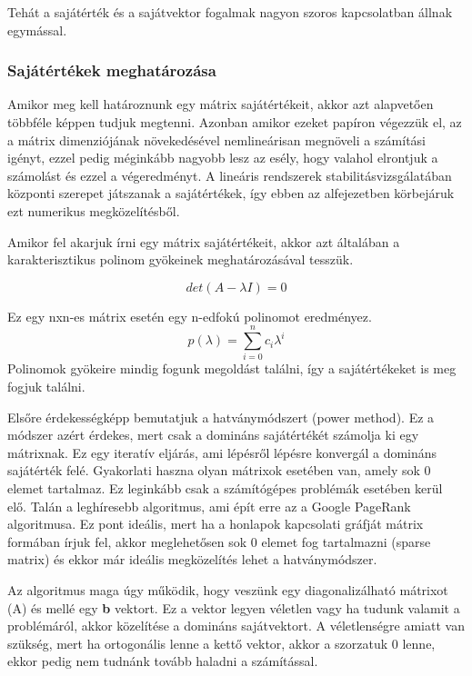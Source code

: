 \documentclass{article}
\theoremstyle{definition}
\theoremstyle{theorem}
\begin{document}
Tehát a sajátérték és a sajátvektor fogalmak nagyon szoros kapcsolatban állnak egymással.

\subsubsection{Sajátértékek meghatározása}
Amikor meg kell határoznunk egy mátrix sajátértékeit, akkor azt alapvetően többféle képpen tudjuk megtenni. Azonban amikor ezeket papíron végezzük el, az a mátrix dimenziójának növekedésével nemlineárisan megnöveli a számítási igényt, ezzel pedig méginkább nagyobb lesz az esély, hogy valahol elrontjuk a számolást és ezzel a végeredményt. A lineáris rendszerek stabilitásvizsgálatában központi szerepet játszanak a sajátértékek, így ebben az alfejezetben körbejáruk ezt numerikus megközelítésből.

Amikor fel akarjuk írni egy mátrix sajátértékeit, akkor azt általában a karakterisztikus polinom gyökeinek meghatározásával tesszük.

\begin{equation*}
    det(A-\lambda I) = 0
\end{equation*}

Ez egy nxn-es mátrix esetén egy  n-edfokú polinomot eredményez.
\begin{equation*}
    p(\lambda) = \sum_{i=0}^{n} c_i \lambda^i
\end{equation*}
Polinomok gyökeire mindig fogunk megoldást találni, így a sajátértékeket is meg fogjuk találni.

Elsőre  érdekességképp bemutatjuk a hatványmódszert (power method). Ez a módszer azért érdekes, mert csak a domináns sajátértékét számolja ki egy mátrixnak. Ez egy iteratív eljárás, ami lépésről lépésre konvergál a domináns sajátérték felé. Gyakorlati haszna olyan mátrixok esetében van, amely sok 0 elemet tartalmaz. Ez leginkább csak a számítógépes problémák esetében kerül elő. Talán a leghíresebb algoritmus, ami épít erre az a Google PageRank\cite{ilprints422} algoritmusa. Ez pont ideális, mert ha a honlapok kapcsolati gráfját mátrix formában írjuk fel, akkor meglehetősen sok 0 elemet fog tartalmazni (sparse matrix) és ekkor már ideális megközelítés lehet a hatványmódszer.

Az algoritmus maga úgy működik, hogy veszünk egy diagonalizálható mátrixot (A) és mellé egy \textbf{b} vektort. Ez a vektor legyen véletlen vagy ha tudunk valamit a problémáról, akkor közelítése a domináns sajátvektort. A véletlenségre amiatt van szükség, mert ha ortogonális lenne a kettő vektor, akkor a szorzatuk 0 lenne, ekkor pedig nem tudnánk tovább haladni a számítással.
\end{document}
